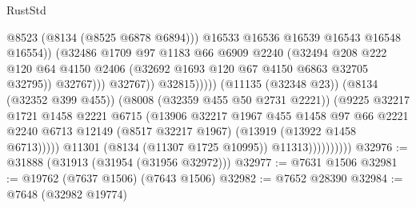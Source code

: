 \begin{lexlean}{RustStd}
\begin{coremodule}
{\begin{coremodule}
{{{{{{{{{{{{{{{{{{{{{{{{{{{{{{{{{{{{{{{{{{{{{{{{{{{{{                                                  @8523
                                                  (@8134 (@8525 @6878 @6894)))
                                                @16533
                                                @16536
                                                @16539
                                                @16543
                                                @16548
                                                @16554))
                                            (@32486
                                              @1709
                                              @97
                                              @1183
                                              @66
                                              @6909
                                              @2240
                                              (@32494
                                                @208
                                                @222
                                                @120
                                                @64
                                                @4150
                                                @2406
                                                (@32692 @1693 @120 @67 @4150 @6863 @32705 @32795))
                                              @32767)))
                                        @32767))
                                    @32815)))))
                          (@11135 (@32348 @23))
                          (@8134 (@32352 @399 @455))
                          (@8008 (@32359 @455 @50 @2731 @2221))
                          (@9225
                            @32217
                            @1721
                            @1458
                            @2221
                            @6715
                            (@13906
                              @32217
                              @1967
                              @455
                              @1458
                              @97
                              @66
                              @2221
                              @2240
                              @6713
                              @12149
                              (@8517 @32217 @1967)
                              (@13919 (@13922 @1458 @6713)))))
                        @11301
                        (@8134 (@11307 @1725 @10995))
                        @11313))))))))))
@32976 := @31888 (@31913 (@31954 (@31956 @32972)))
@32977 := @7631 @1506
@32981 := @19762 (@7637 @1506) (@7643 @1506)
@32982 := @7652 @28390
@32984 := @7648 (@32982 @19774)
}}}}}}}}}}}}}}}}}}}}}}}}}}}}}}}}}}}}}}}}}}}}}}}}}}}}}
\end{coremodule}}
\end{coremodule}
\end{lexlean}
